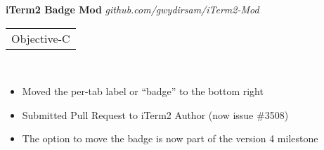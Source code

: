 \documentclass[margin,line,12pt]{res}
\begin{document}
{\begin{resume}


{\bf iTerm2 Badge Mod} {\em  github.com/gwydirsam/iTerm2-Mod}  \
\\
\begin{tabular}{l}
  Objective-C
\end{tabular}
\\
\vspace{-.16in}
\begin{itemize}
  \item Moved the per-tab label or ``badge'' to the bottom right
  \item Submitted Pull Request to iTerm2 Author (now issue \#3508)
  \item The option to move the badge is now part of the version 4 milestone
\end{itemize}
\vspace{-.10in}


\end{resume}}
\end{document}
